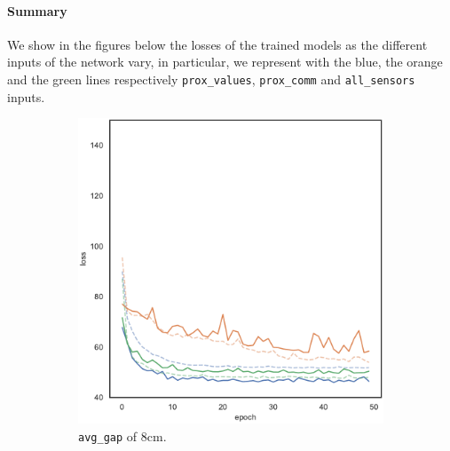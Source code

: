 \paragraph*{Summary}
We show in the figures below the losses of the trained models as the different 
inputs of the network vary, in particular, we represent with the blue, the orange 
and the green lines respectively \texttt{prox\_values}, \texttt{prox\_comm} and
\texttt{all\_sensors} inputs.
\begin{figure}[!htb]
	\centering
	\begin{subfigure}[h]{0.3\textwidth}
		\centering
		\includegraphics[width=\textwidth]{contents/images/task1/loss-distributed-gap_8@copy}%
		\caption{\texttt{avg\_gap} of $8$\gls{cm}.}
	\end{subfigure}
	\hfill
	\begin{subfigure}[h]{0.3\textwidth}
		\centering

\end{subfigure}
\end{figure}

